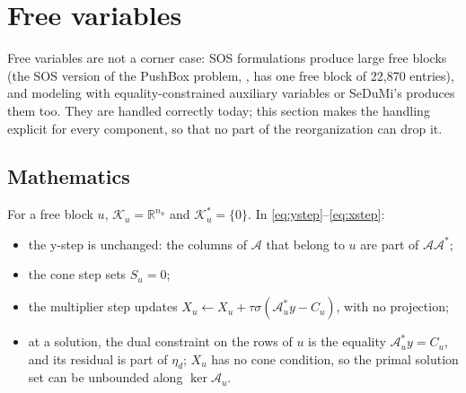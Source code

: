\documentclass[11pt]{article}
\newcommand{\R}{\mathbb{R}}
\newcommand{\K}{\mathcal{K}}
\newcommand{\Kd}{\mathcal{K}^{*}}
\newcommand{\A}{\mathcal{A}}
\newcommand{\Ad}{\mathcal{A}^{*}}
\begin{document}
\section{Free variables}\label{sec:free}

Free variables are not a corner case: SOS formulations produce large free blocks (the SOS version of the
PushBox problem, , has one free block of 22{,}870 entries), and
modeling with equality-constrained auxiliary variables or SeDuMi's  produces them too. They are
handled correctly today; this section makes the handling explicit for every component, so that no part of
the reorganization can drop it.

\subsection{Mathematics}
For a free block $u$, $\K_u = \R^{n_u}$ and $\Kd_u = \{0\}$. In \eqref{eq:ystep}--\eqref{eq:xstep}:
\begin{itemize}
  \item the y-step is unchanged: the columns of $\A$ that belong to $u$ are part of $\A\Ad$;
  \item the cone step sets $S_u = 0$;
  \item the multiplier step updates $X_u \leftarrow X_u + \tau\sigma(\A_u^* y - C_u)$, with no projection;
  \item at a solution, the dual constraint on the rows of $u$ is the equality $\A_u^* y = C_u$, and its
  residual is part of $\eta_d$; $X_u$ has no cone condition, so the primal solution set can be unbounded
  along $\ker\A_u$.
\end{itemize}
\end{document}
